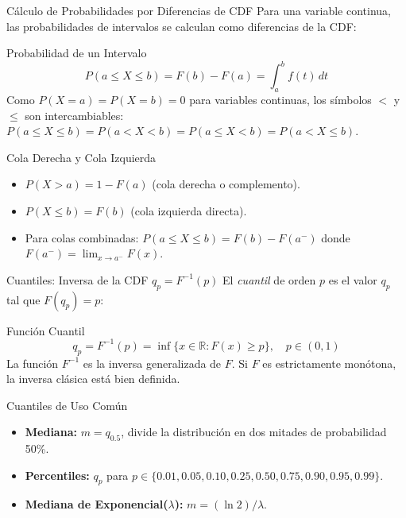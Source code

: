 \documentclass[10pt, aspectratio=169]{beamer}
\begin{document}
\begin{frame}{Cálculo de Probabilidades por Diferencias de CDF}
  \footnotesize
  Para una variable continua, las probabilidades de intervalos se calculan como diferencias de la CDF: \pause

  \vspace{0.1cm}
  \begin{block}{Probabilidad de un Intervalo}
    $$P(a \le X \le b) = F(b) - F(a) = \int_{a}^{b} f(t)\,dt$$
    Como $P(X = a) = P(X = b) = 0$ para variables continuas, los símbolos $<$ y $\le$ son intercambiables: $P(a \le X \le b) = P(a < X < b) = P(a \le X < b) = P(a < X \le b)$.
  \end{block}

  \vspace{0.1cm}
  \pause
  \begin{alertblock}{Cola Derecha y Cola Izquierda}
    \begin{itemize}\itemsep=0.05cm
      \item $P(X > a) = 1 - F(a)$ (cola derecha o complemento).
      \item $P(X \le b) = F(b)$ (cola izquierda directa).
      \item Para colas combinadas: $P(a \le X \le b) = F(b) - F(a^{-})$ donde $F(a^{-}) = \lim_{x \to a^{-}} F(x)$.
    \end{itemize}
  \end{alertblock}
\end{frame}

\begin{frame}{Cuantiles: Inversa de la CDF $q_{p} = F^{-1}(p)$}
  \footnotesize
  El \emph{cuantil} de orden $p$ es el valor $q_{p}$ tal que $F(q_{p}) = p$: \pause

  \vspace{0.1cm}
  \begin{block}{Función Cuantil}
    $$q_{p} = F^{-1}(p) = \inf\{x \in \mathbb{R} : F(x) \ge p\}, \quad p \in (0, 1)$$
    La función $F^{-1}$ es la inversa generalizada de $F$. Si $F$ es estrictamente monótona, la inversa clásica está bien definida.
  \end{block}

  \vspace{0.1cm}
  \pause
  \begin{alertblock}{Cuantiles de Uso Común}
    \begin{itemize}\itemsep=0.05cm
      \item \textbf{Mediana:} $m = q_{0.5}$, divide la distribución en dos mitades de probabilidad 50\%.
      \item \textbf{Percentiles:} $q_{p}$ para $p \in \{0.01, 0.05, 0.10, 0.25, 0.50, 0.75, 0.90, 0.95, 0.99\}$.
      \item \textbf{Mediana de Exponencial($\lambda$):} $m = (\ln 2)/\lambda$.
    \end{itemize}
  \end{alertblock}
\end{frame}
\end{document}
